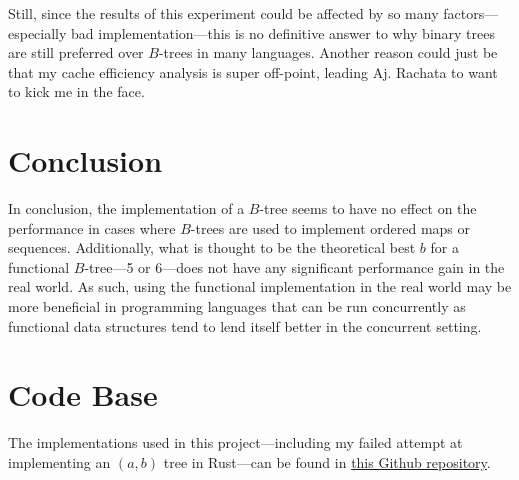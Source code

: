 \documentclass{article}
\begin{document}
Still, since the results of this experiment could be affected by so many factors---especially
bad implementation---this is no definitive answer to why binary trees are still preferred over
$B$-trees in many languages. Another reason could just be that my cache efficiency analysis is
super off-point, leading Aj. Rachata to want to kick me in the face.

\section{Conclusion}

In conclusion, the implementation of a $B$-tree seems to have no effect on the performance
in cases where $B$-trees are used to implement ordered maps or sequences. Additionally, what is
thought to be the theoretical best $b$ for a functional $B$-tree---5 or 6---does not have any
significant performance gain in the real world. As such, using the functional implementation
in the real world may be more beneficial in programming languages that can be run concurrently
as functional data structures tend to lend itself better in the concurrent setting.

\section{Code Base}

The implementations used in this project---including my failed attempt at implementing an $(a, b)$
tree in Rust---can be found in \href{https://github.com/nngerncham/funcvimp-ab-trees}{this Github
repository}.
\end{document}
